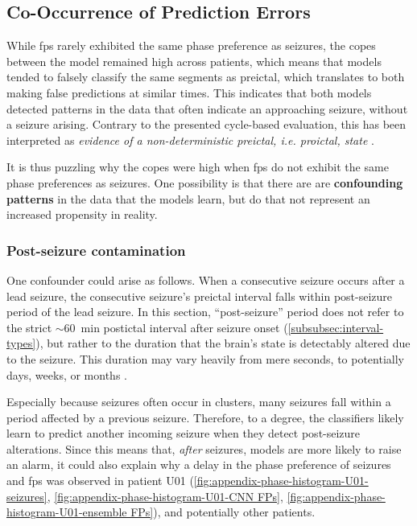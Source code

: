 \subsection{Co-Occurrence of Prediction Errors}
While \glspl{fp} rarely exhibited the same phase preference as seizures, the \glspl{cope} between the model remained high across patients, which means that models tended to falsely classify the same segments as preictal, which translates to both making false predictions at similar times.
This indicates that both models detected patterns in the data that often indicate an approaching seizure, without a seizure arising.
Contrary to the presented cycle-based evaluation, this has been interpreted as \textit{evidence of a non-deterministic preictal, i.e. proictal, state} \parencite{muller_coherent_2022}.

It is thus puzzling why the \glspl{cope} were high when \glspl{fp} do not exhibit the same phase preferences as seizures.
One possibility is that there are are \textbf{confounding patterns} in the data that the models learn, but do that not represent an increased propensity in reality.


\subsubsection{Post-seizure contamination}
One confounder could arise as follows.
When a consecutive seizure occurs after a lead seizure, the consecutive seizure's preictal interval falls within post-seizure period of the lead seizure.
In this section, \enquote{post-seizure} period does not refer to the strict $\sim$\SI{60}{\minute} postictal interval after seizure onset (\cref{subsubsec:interval-types}), but rather to the duration that the brain's state is detectably altered due to the seizure.
This duration may vary heavily from mere seconds, to potentially days, weeks, or months \parencite{fisher_definition_2010}. 

Especially because seizures often occur in clusters, many seizures fall within a period affected by a previous seizure.
Therefore, to a degree, the classifiers likely learn to predict another incoming seizure when they detect post-seizure alterations.
Since this means that, \textit{after} seizures, models are more likely to raise an alarm, it could also explain why a delay in the phase preference of seizures and \glspl{fp} was observed in patient U01 (\cref{fig:appendix-phase-histogram-U01-seizures}, \cref{fig:appendix-phase-histogram-U01-CNN FPs}, \cref{fig:appendix-phase-histogram-U01-ensemble FPs}), and potentially other patients.

